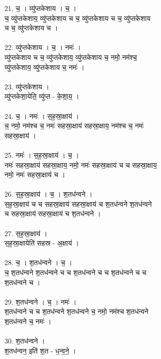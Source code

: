 21. च॒ । व्यु॑प्तकेशाय । च॒ ।\\
च॒ व्यु॑प्तकेशाय॒ व्यु॑प्तकेशाय च च॒ व्यु॑प्तकेशाय च च॒ व्यु॑प्तकेशाय\\
च च॒ व्यु॑प्तकेशाय च ।\\
\\
22. व्यु॑प्तकेशाय । च॒ । नमः॑ ।\\
व्यु॑प्तकेशाय च च॒ व्यु॑प्तकेशाय॒ व्यु॑प्तकेशाय च॒ नमो॒ नम॑श्च॒\\
व्यु॑प्तकेशाय॒ व्यु॑प्तकेशाय च॒ नमः॑ ।\\
\\
23. व्यु॑प्तकेशाय ।\\
व्यु॑प्तकेशा॒येति॒ व्यु॑प्त - के॒शा॒य॒ ।\\
\\
24. च॒ । नमः॑ । स॒ह॒स्रा॒क्षाय॑ ।\\
च॒ नमो॒ नम॑श्च च॒ नमः॑ सहस्रा॒क्षाय॑ सहस्रा॒क्षाय॒ नम॑श्च च॒ नमः॑\\
सहस्रा॒क्षाय॑ ।\\
\\
25. नमः॑ । स॒ह॒स्रा॒क्षाय॑ । च॒ ।\\
नमः॑ सहस्रा॒क्षाय॑ सहस्रा॒क्षाय॒ नमो॒ नमः॑ सहस्रा॒क्षाय॑ च च सहस्रा॒क्षाय॒\\
नमो॒ नमः॑ सहस्रा॒क्षाय॑ च ।\\
\\
26. स॒ह॒स्रा॒क्षाय॑ । च॒ । श॒तध॑न्वने ।\\
स॒ह॒स्रा॒क्षाय॑ च च सहस्रा॒क्षाय॑ सहस्रा॒क्षाय॑ च श॒तध॑न्वने श॒तध॑न्वने\\
च सहस्रा॒क्षाय॑ सहस्रा॒क्षाय॑ च श॒तध॑न्वने ।\\
\\
27. स॒ह॒स्रा॒क्षाय॑ ।\\
स॒ह॒स्रा॒क्षायेति॑ सहस्र - अ॒क्षाय॑ ।\\
\\
28. च॒ । श॒तध॑न्वने । च॒ ।\\
च॒ श॒तध॑न्वने श॒तध॑न्वने च च श॒तध॑न्वने च च श॒तध॑न्वने च च\\
श॒तध॑न्वने च ।\\
\\
29. श॒तध॑न्वने । च॒ । नमः॑ ।\\
श॒तध॑न्वने च च श॒तध॑न्वने श॒तध॑न्वने च॒ नमो॒ नम॑श्च श॒तध॑न्वने\\
श॒तध॑न्वने च॒ नमः॑ ।\\
\\
30. श॒तध॑न्वने ।\\
श॒तध॑न्वन॒ इति॑ श॒त - ध॒न्व॒ने॒ ।\\
\\
